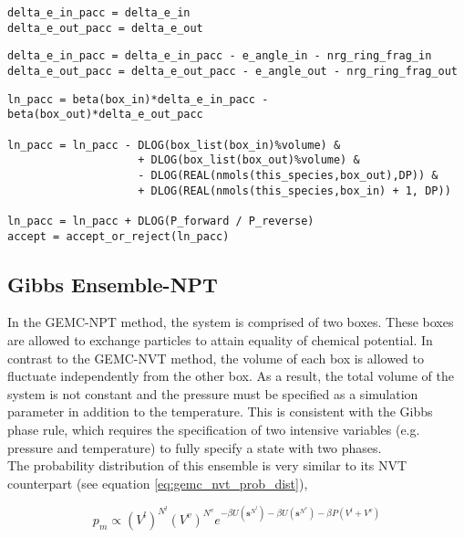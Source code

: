 \begin{minipage}{\linewidth}
\begin{lstlisting}[firstnumber=505, caption=gemc\_particle\_transfer.f90]
delta_e_in_pacc = delta_e_in
delta_e_out_pacc = delta_e_out
\end{lstlisting}

\begin{lstlisting}[firstnumber=518]
delta_e_in_pacc = delta_e_in_pacc - e_angle_in - nrg_ring_frag_in
delta_e_out_pacc = delta_e_out_pacc - e_angle_out - nrg_ring_frag_out
\end{lstlisting}


\begin{lstlisting}[firstnumber=526]
ln_pacc = beta(box_in)*delta_e_in_pacc - beta(box_out)*delta_e_out_pacc

ln_pacc = ln_pacc - DLOG(box_list(box_in)%volume) &
                    + DLOG(box_list(box_out)%volume) &
                    - DLOG(REAL(nmols(this_species,box_out),DP)) &
                    + DLOG(REAL(nmols(this_species,box_in) + 1, DP))

ln_pacc = ln_pacc + DLOG(P_forward / P_reverse)
accept = accept_or_reject(ln_pacc)
\end{lstlisting}
\end{minipage}


\subsection{Gibbs Ensemble-NPT} 
\label{sec:gibbs_npt}

In the GEMC-NPT method, the system is comprised of two boxes. These boxes are allowed to exchange
particles to attain equality of chemical potential. In contrast to
the GEMC-NVT method, the volume of each box is allowed to fluctuate
independently from the other box. As a result, the total volume of the system is not constant and the 
pressure must be specified as a simulation parameter in addition to the temperature.
This is consistent with the Gibbs phase rule, which requires the specification of two intensive
variables (e.g. pressure and temperature) to fully specify a state with two phases. \\

The probability distribution of this ensemble is very similar to its NVT counterpart (see
equation \ref{eq:gemc_nvt_prob_dist}), 

\begin{equation}
p_m \propto (V^l)^{N^l} (V^v)^{N^v} e^{-\beta U \left(\textbf{s}^{N^l}\right) -\beta U \left(\textbf{s}^{N^v}\right)
- \beta P \left(V^l + V^v\right) }
\label{eq:gemc_npt_prob_dist}
\end{equation}

